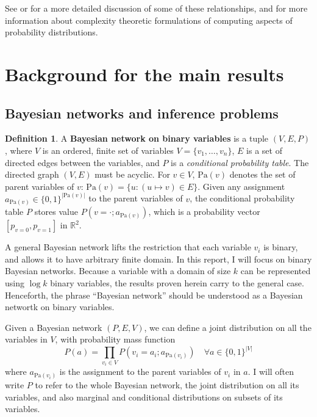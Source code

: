 \documentclass{article}
\theoremstyle{definition}
\newtheorem{defn}{Definition}
\theoremstyle{remark}
\def \Pa{\text{Pa}}
\begin{document}
\noindent See \cite{yamakami1999polynomial} or \cite{edmonds2017concepts} for a more detailed discussion of some of these relationships, and for more information about complexity theoretic formulations of computing aspects of probability distributions.

\section{Background for the main results} \label{sec:background}

\subsection{Bayesian networks and inference problems}
\begin{defn}
A \textbf{Bayesian network on binary variables} is a tuple $(V, E, P)$, where $V$ is an ordered, finite set of variables $V = \{v_1, \dots, v_n\}$, $E$ is a set of directed edges between the variables, and $P$ is a \textit{conditional probability table}.
The directed graph $(V, E)$ must be acyclic.
For $v \in V$, $\Pa(v)$ denotes the set of parent variables of $v$: $\Pa(v) = \{u : (u \mapsto v) \in E\}$.
Given any assignment $a_{\Pa(v)} \in \{0, 1\}^{|\Pa(v)|}$ to the parent variables of $v$, the conditional probability table $P$ stores value $P(v = \cdot ; a_{\Pa(v)})$, which is a probability vector $[p_{v=0}, p_{v=1}]$ in $\mathbb{R}^2$.
\end{defn}

A general Bayesian network lifts the restriction that each variable $v_i$ is binary, and allows it to have arbitrary finite domain.
In this report, I will focus on binary Bayesian networks. Because a variable with a domain of size $k$ can be represented using $\log k$ binary variables, the results proven herein carry to the general case.
Henceforth, the phrase ``Bayesian network'' should be understood as a Bayesian networtk on binary variables.

Given a Bayesian network $(P, E, V)$, we can define a joint distribution on all the variables in $V$, with probability mass function
$$
P(a) = \prod_{v_i \in V}{P(v_i = a_i ; a_{\Pa(v_i)})} \quad \forall a \in \{0, 1\}^{|V|}
$$
where $a_{\Pa(v_i)}$ is the assignment to the parent variables of $v_i$ in $a$.
I will often write $P$ to refer to the whole Bayesian network, the joint distribution on all its variables, and also marginal and conditional distributions on subsets of its variables.
\end{document}
